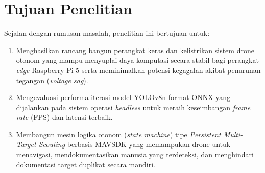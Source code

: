 \section{Tujuan Penelitian}
Sejalan dengan rumusan masalah, penelitian ini bertujuan untuk:
\begin{enumerate}
	\item Menghasilkan rancang bangun perangkat keras dan kelistrikan sistem drone otonom yang mampu menyuplai daya komputasi secara stabil bagi perangkat \textit{edge} Raspberry Pi 5 serta meminimalkan potensi kegagalan akibat penurunan tegangan (\textit{voltage sag}).
	\item Mengevaluasi performa iterasi model YOLOv8n format ONNX yang dijalankan pada sistem operasi \textit{headless} untuk meraih keseimbangan \textit{frame rate} (FPS) dan latensi terbaik.
	\item Membangun mesin logika otonom (\textit{state machine}) tipe \textit{Persistent Multi-Target Scouting} berbasis MAVSDK yang memampukan drone untuk menavigasi, mendokumentasikan manusia yang terdeteksi, dan menghindari dokumentasi target duplikat secara mandiri.
\end{enumerate}

